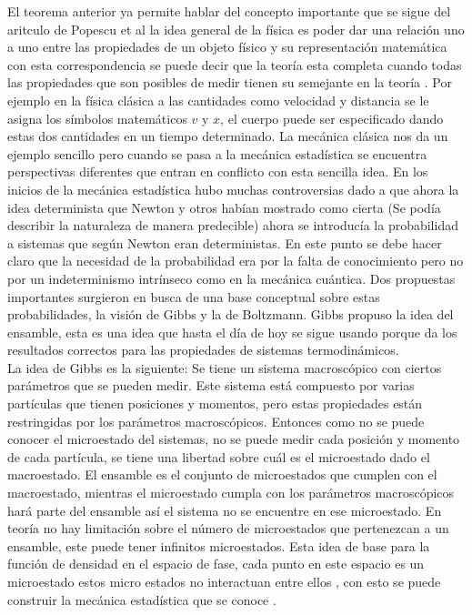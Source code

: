 El teorema anterior ya permite hablar del concepto importante que se sigue del aritculo de Popescu et al la idea general de la física es poder dar una relación uno a uno entre las propiedades de un objeto físico y su representación matemática con esta correspondencia se puede decir que la teoría esta completa cuando todas las propiedades que son posibles de medir tienen su semejante en la teoría \cite{Decoherence}. Por ejemplo en la física clásica a las cantidades como velocidad y distancia se le asigna los símbolos matemáticos $v$ y $x$, el cuerpo puede ser especificado dando estas dos cantidades en un tiempo determinado. La mecánica clásica nos da un ejemplo sencillo pero cuando se pasa a la mecánica estadística se encuentra perspectivas diferentes que entran en conflicto con esta sencilla idea. En los inicios de la mecánica estadística hubo muchas controversias dado a que ahora la idea determinista que Newton y otros habían mostrado como cierta (Se podía describir la naturaleza de manera predecible) ahora se introducía la probabilidad a sistemas que según Newton eran deterministas. En este punto se debe hacer claro que la necesidad de la probabilidad era por la falta de conocimiento pero no por un indeterminismo intrínseco como en la mecánica cuántica. Dos propuestas importantes surgieron en busca de una base conceptual sobre estas probabilidades, la visión de Gibbs y la de Boltzmann. Gibbs propuso la idea del ensamble, esta es una idea que hasta el día de hoy se sigue usando porque da los resultados correctos para las propiedades de sistemas termodinámicos.\\
La idea de Gibbs es la siguiente: Se tiene un sistema macroscópico con ciertos parámetros que se pueden medir. Este sistema está compuesto por varias partículas que tienen posiciones y momentos, pero estas propiedades están restringidas por los parámetros macroscópicos. Entonces como no se puede conocer el microestado del sistemas, no se puede medir cada posición y momento de cada partícula, se tiene una libertad sobre cuál es el microestado dado el macroestado. El ensamble es el conjunto de microestados que cumplen con el macroestado, mientras el microestado cumpla con los parámetros macroscópicos hará parte del ensamble así el sistema no se encuentre en ese microestado. En teoría no hay limitación sobre el número de microestados que pertenezcan a un ensamble, este puede tener infinitos microestados. Esta idea de base para la función de densidad en el espacio de fase, cada punto en este espacio es un microestado estos micro estados no interactuan entre ellos , con esto se puede construir la mecánica estadística que se conoce \cite{PathriaStat}. 
